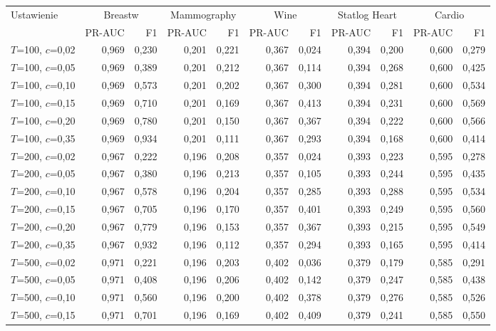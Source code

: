 \begin{longtable}{lrrrrrrrrrr}
\toprule
Ustawienie & \multicolumn{2}{c}{Breastw} & \multicolumn{2}{c}{Mammography} & \multicolumn{2}{c}{Wine} & \multicolumn{2}{c}{Statlog Heart} & \multicolumn{2}{c}{Cardio} \\
 & PR-AUC & F1 & PR-AUC & F1 & PR-AUC & F1 & PR-AUC & F1 & PR-AUC & F1 \\
\midrule
\endhead
$T$=100, $c$=0,02 & 0,969 & 0,230 & 0,201 & 0,221 & 0,367 & 0,024 & 0,394 & 0,200 & 0,600 & 0,279 \\
$T$=100, $c$=0,05 & 0,969 & 0,389 & 0,201 & 0,212 & 0,367 & 0,114 & 0,394 & 0,268 & 0,600 & 0,425 \\
$T$=100, $c$=0,10 & 0,969 & 0,573 & 0,201 & 0,202 & 0,367 & 0,300 & 0,394 & 0,281 & 0,600 & 0,534 \\
$T$=100, $c$=0,15 & 0,969 & 0,710 & 0,201 & 0,169 & 0,367 & 0,413 & 0,394 & 0,231 & 0,600 & 0,569 \\
$T$=100, $c$=0,20 & 0,969 & 0,780 & 0,201 & 0,150 & 0,367 & 0,367 & 0,394 & 0,222 & 0,600 & 0,566 \\
$T$=100, $c$=0,35 & 0,969 & 0,934 & 0,201 & 0,111 & 0,367 & 0,293 & 0,394 & 0,168 & 0,600 & 0,414 \\
$T$=200, $c$=0,02 & 0,967 & 0,222 & 0,196 & 0,208 & 0,357 & 0,024 & 0,393 & 0,223 & 0,595 & 0,278 \\
$T$=200, $c$=0,05 & 0,967 & 0,380 & 0,196 & 0,213 & 0,357 & 0,105 & 0,393 & 0,244 & 0,595 & 0,435 \\
$T$=200, $c$=0,10 & 0,967 & 0,578 & 0,196 & 0,204 & 0,357 & 0,285 & 0,393 & 0,288 & 0,595 & 0,534 \\
$T$=200, $c$=0,15 & 0,967 & 0,705 & 0,196 & 0,170 & 0,357 & 0,401 & 0,393 & 0,249 & 0,595 & 0,560 \\
$T$=200, $c$=0,20 & 0,967 & 0,779 & 0,196 & 0,153 & 0,357 & 0,367 & 0,393 & 0,215 & 0,595 & 0,549 \\
$T$=200, $c$=0,35 & 0,967 & 0,932 & 0,196 & 0,112 & 0,357 & 0,294 & 0,393 & 0,165 & 0,595 & 0,414 \\
$T$=500, $c$=0,02 & 0,971 & 0,221 & 0,196 & 0,203 & 0,402 & 0,036 & 0,379 & 0,179 & 0,585 & 0,291 \\
$T$=500, $c$=0,05 & 0,971 & 0,408 & 0,196 & 0,206 & 0,402 & 0,142 & 0,379 & 0,247 & 0,585 & 0,438 \\
$T$=500, $c$=0,10 & 0,971 & 0,560 & 0,196 & 0,200 & 0,402 & 0,378 & 0,379 & 0,276 & 0,585 & 0,526 \\
$T$=500, $c$=0,15 & 0,971 & 0,701 & 0,196 & 0,169 & 0,402 & 0,409 & 0,379 & 0,241 & 0,585 & 0,550 \\

\end{longtable}
